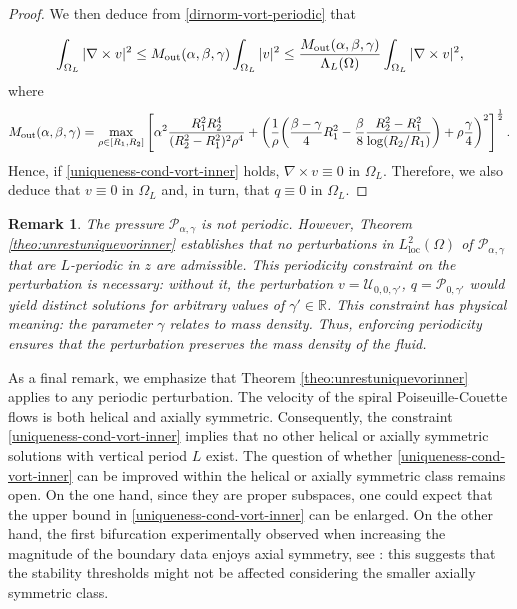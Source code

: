 \documentclass[a4paper,11pt]{amsart}
\newtheorem{remark}{Remark}[section]
\numberwithin{equation}{section}
\numberwithin{figure}{section}
\begin{document}
\begin{proof}
	We then deduce from \eqref{dirnorm-vort-periodic} that

	\begin{equation*}
		\int_{\Omega_L} |\nabla\times v|^2 \leq {M}_{\rm out}(\alpha,\beta,\gamma)\int_{\Omega_L} |v|^2\leq \frac{{M}_{\rm out}(\alpha,\beta,\gamma)}{\Lambda_L(\Omega)}\int_{\Omega_L} |\nabla\times v|^2,
	\end{equation*}
	where
	\begin{equation*}
	\begin{aligned}
		{M}_{\rm out}(\alpha,\beta,\gamma)=
        \max_{\rho\in [R_1,R_2]}\left[\alpha^2 \frac{R_1^2R_2^4}{(R_2^2 -R_1^2)^2\rho^4} +\left(\frac{1}{\rho}
		\bigg(\frac{\beta-\gamma}{4}R_1^2
		-\frac{\beta}{8}\frac{R_2^2-R_1^2}{\log(R_2/R_1)}\bigg)
		+\rho\frac{\gamma}{4} \right)^2\right]^{\frac{1}{2}}.
	\end{aligned}
	\end{equation*}
	Hence, if \eqref{uniqueness-cond-vort-inner} holds, $\nabla\times v\equiv0$ in $\Omega_L$.  Therefore, we also deduce that $v\equiv0$ in $\Omega_L$ and, in turn,  that  $q\equiv0$ in $\Omega_L$.\end{proof}

\begin{remark}
	The pressure $\mathcal{P}_{\alpha,\gamma}$ is not periodic. However, Theorem \ref{theo:unrestuniquevorinner} establishes that no perturbations in $L^2_{\mathrm{loc}}(\Omega)$ of $\mathcal{P}_{\alpha,\gamma}$ that are $L$-periodic in $z$ are admissible. This periodicity constraint on the perturbation is necessary: without it, the perturbation $v = \mathcal{U}_{0,0,\gamma'}$, $q = \mathcal{P}_{0,\gamma'}$ would yield distinct solutions for arbitrary values of $\gamma'\in \mathbb{R}$.	
	This constraint has physical meaning: the parameter $\gamma$ relates to mass density. Thus, enforcing periodicity ensures that the perturbation preserves the mass density of the fluid.
\end{remark}

As a final remark, we emphasize that Theorem \ref{theo:unrestuniquevorinner} applies to any periodic perturbation. The velocity of the spiral Poiseuille-Couette flows is both helical and axially symmetric. Consequently, the constraint  \eqref{uniqueness-cond-vort-inner} implies that no other helical or axially symmetric solutions with vertical period $L$ exist. The question of whether \eqref{uniqueness-cond-vort-inner} can be improved within the helical or axially symmetric class remains open. On the one hand, since they are proper subspaces, one could expect that the upper bound in \eqref{uniqueness-cond-vort-inner} can be enlarged. On the other hand, the first bifurcation experimentally observed when increasing the magnitude of the boundary data enjoys axial symmetry, see \cite{Chossat}: this suggests that the stability thresholds might not be affected considering the smaller axially symmetric class.
\appendix
\end{document}
